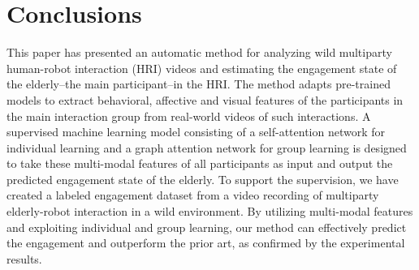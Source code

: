 \documentclass[VANCOUVER,STIX1COL]{WileyNJD-v2}
\begin{document}
\section{Conclusions}
\label{s:Conclusions}
This paper has presented an automatic method for analyzing wild multiparty human-robot interaction (HRI) videos and estimating the engagement state of the elderly--the main participant--in the HRI. The method adapts pre-trained models to extract behavioral, affective and visual features of the participants in the main interaction group from real-world videos of such interactions. A supervised machine learning model consisting of a self-attention network for individual learning and a graph attention network for group learning is designed to take these multi-modal features of all participants as input and output the predicted engagement state of the elderly. To support the supervision, we have created a labeled engagement dataset from a video recording of multiparty elderly-robot interaction in a wild environment. By utilizing multi-modal features and exploiting individual and group learning, our method can effectively predict the engagement and outperform the prior art, as confirmed by the experimental results.










\end{document}
